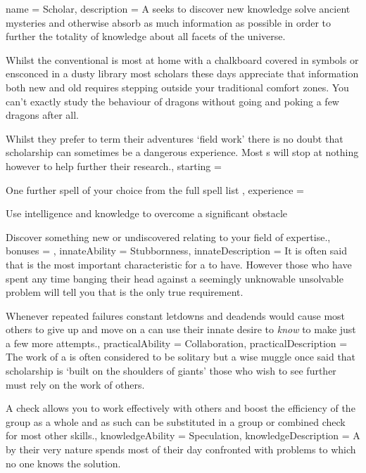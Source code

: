\archetype
{
	name = Scholar,
	description = A \bname{} seeks to discover new knowledge\comma{} solve ancient mysteries and otherwise absorb as much information as possible\comma{} in order to further the totality of knowledge about all facets of the universe. 

Whilst the conventional \bname{} is most at home with a chalkboard covered in symbols\comma{} or ensconced in a dusty library\comma{} most scholars these days appreciate that information\comma{} both new and old\comma{} requires stepping outside your traditional comfort zones. You can’t exactly study the behaviour of dragons without going and poking a few dragons\comma{} after all. 

Whilst they prefer to term their adventures `field work’\comma{} there is no doubt that scholarship can sometimes be a dangerous experience. Most \bname{}s will stop at nothing\comma{} however\comma{} to help further their research.,
	starting = 
\item One further spell of your choice from the full spell list 
,
	experience = \item Use intelligence and knowledge to overcome a significant obstacle
\item Discover something new or undiscovered relating to your field of expertise.,
	bonuses = 
,
	innateAbility = Stubbornness,
	innateDescription = It is often said that  is the most important characteristic for a  to have. However\comma{} those who have spent any time banging their head against a seemingly unknowable\comma{} unsolvable problem will tell you that  is the only true requirement. 

Whenever repeated failures\comma{} constant letdowns and deadends would cause most others to give up and move on\comma{} a \bname{} can use their innate desire to {\it know} to make just a few more attempts.,
	practicalAbility = Collaboration,
	practicalDescription = The work of a \bname{} is often considered to be solitary\comma{} but a wise muggle once said that scholarship is `built on the shoulders of giants’ \minus{} those who wish to see further must rely on the work of others. 

A  check allows you to work effectively with others\comma{} and boost the efficiency of the group as a whole\comma{} and as such can be substituted in a group or combined check for most other skills.,
	knowledgeAbility = Speculation,
	knowledgeDescription = A \bname{}\comma{} by their very nature\comma{} spends most of their day confronted with problems to which no one knows the solution. 

}
